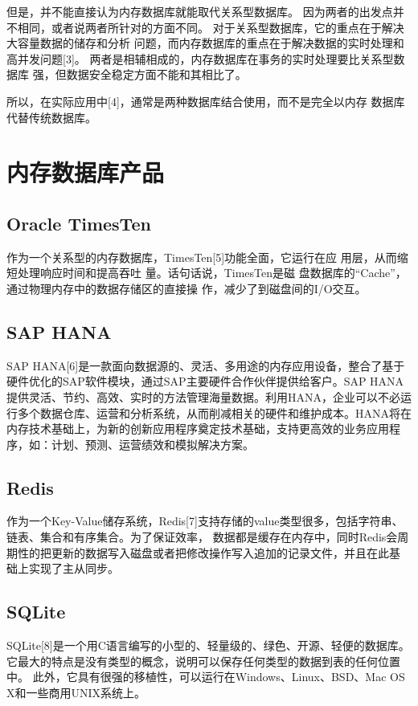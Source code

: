 \documentclass{zjutthesis}
\begin{document}
但是，并不能直接认为内存数据库就能取代关系型数据库。
因为两者的出发点并不相同，或者说两者所针对的方面不同。
对于关系型数据库，它的重点在于解决大容量数据的储存和分析
问题，而内存数据库的重点在于解决数据的实时处理和高并发问题[3]。
两者是相辅相成的，内存数据库在事务的实时处理要比关系型数据库
强，但数据安全稳定方面不能和其相比了。

所以，在实际应用中[4]，通常是两种数据库结合使用，而不是完全以内存
数据库代替传统数据库。

\section{内存数据库产品}
\subsection{Oracle TimesTen}
作为一个关系型的内存数据库，TimesTen[5]功能全面，它运行在应
用层，从而缩短处理响应时间和提高吞吐
量。话句话说，TimesTen是磁
盘数据库的“Cache”，通过物理内存中的数据存储区的直接操
作，减少了到磁盘间的I/O交互。

\subsection{SAP HANA}
SAP HANA[6]是一款面向数据源的、灵活、多用途的内存应用设备，整合了基于硬件优化的SAP软件模块，通过SAP主要硬件合作伙伴提供给客户。SAP HANA提供灵活、节约、高效、实时的方法管理海量数据。利用HANA，企业可以不必运行多个数据仓库、运营和分析系统，从而削减相关的硬件和维护成本。HANA将在内存技术基础上，为新的创新应用程序奠定技术基础，支持更高效的业务应用程序，如：计划、预测、运营绩效和模拟解决方案。

\subsection{Redis}
作为一个Key-Value储存系统，Redis[7]支持存储的value类型很多，包括字符串、链表、集合和有序集合。为了保证效率，
数据都是缓存在内存中，同时Redis会周期性的把更新的数据写入磁盘或者把修改操作写入追加的记录文件，并且在此基
础上实现了主从同步。

\subsection{SQLite}
SQLite[8]是一个用C语言编写的小型的、轻量级的、绿色、开源、轻便的数据库。
它最大的特点是没有类型的概念，说明可以保存任何类型的数据到表的任何位置中。
此外，它具有很强的移植性，可以运行在Windows、Linux、BSD、Mac OS X和一些商用UNIX系统上。
\end{document}
